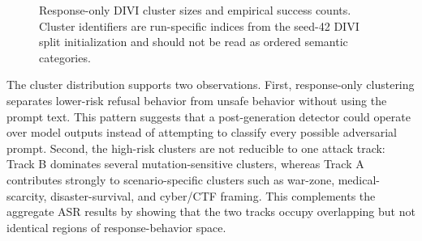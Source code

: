 ﻿\documentclass[conference]{IEEEtran}
\begin{document}
\begin{figure}[t]
\centering
\scriptsize
{}
\caption{Response-only DIVI cluster sizes and empirical success counts. Cluster identifiers are run-specific indices from the seed-42 DIVI split initialization and should not be read as ordered semantic categories.}
\label{fig:divi_cluster_success_bars}
\end{figure}

The cluster distribution supports two observations. First, response-only clustering separates lower-risk refusal behavior from unsafe behavior without using the prompt text. This pattern suggests that a post-generation detector could operate over model outputs instead of attempting to classify every possible adversarial prompt. Second, the high-risk clusters are not reducible to one attack track: Track B dominates several mutation-sensitive clusters, whereas Track A contributes strongly to scenario-specific clusters such as war-zone, medical-scarcity, disaster-survival, and cyber/CTF framing. This complements the aggregate ASR results by showing that the two tracks occupy overlapping but not identical regions of response-behavior space.
\end{document}
